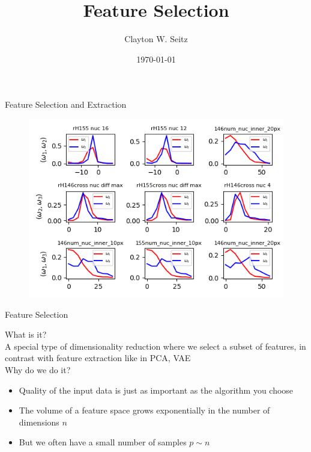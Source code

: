 \documentclass{beamer}					%
\title{Feature Selection}	%
\author{Clayton W. Seitz}								%
\date{\today}									%
\begin{document}
\begin{frame}
  \titlepage
\end{frame}

%

\begin{frame}{Feature Selection and Extraction}

\begin{center}
\begin{figure}
\includegraphics[width=1.0\textwidth]{features.png}
\end{figure}
\end{center}
\end{frame}

\begin{frame}{Feature Selection}

What is it?\\
\vspace{0.2in}
A special type of dimensionality reduction where we select a subset of features, in contrast with feature extraction like in PCA, VAE\\
\vspace{0.2in}
Why do we do it? \\
\vspace{0.2in}
\begin{itemize}
\item Quality of the input data is just as important as the algorithm you choose
\item The volume of a feature space grows exponentially in the number of dimensions $n$
\item But we often have a small number of samples $p\sim n$
\end{itemize}

\end{frame}
\end{document}
